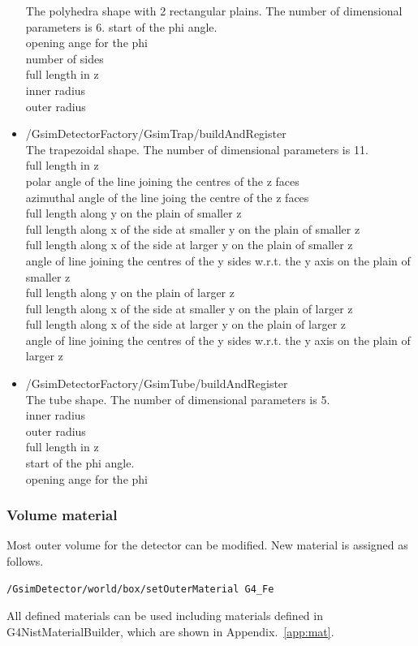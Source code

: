 \documentclass[a4paper,12pt]{article}
\begin{document}
\begin{itemize}
	The polyhedra shape with 2 rectangular plains.
	The number of dimensional parameters is 6.
	start of the phi angle.\\
	opening ange for the phi\\
	number of sides\\
	full length in z\\
	inner radius\\
	outer radius
  \item /GsimDetectorFactory/GsimTrap/buildAndRegister\\
	The trapezoidal shape.
	The number of dimensional parameters is 11.\\
	full length in z\\
	polar angle of the line joining the centres of the z faces\\
	azimuthal angle of the line joing the centre of the z faces\\
	full length along y on the plain of smaller z\\
	full length along x of the side at smaller y on the plain of smaller z\\
	full length along x of the side at larger y on the plain of smaller z\\
	angle of line joining the centres of the y sides w.r.t. the y
	axis on the plain of smaller z\\
	full length along y on the plain of larger z\\
	full length along x of the side at smaller y on the plain of larger z\\
	full length along x of the side at larger y on the plain of larger z\\
	angle of line joining the centres of the y sides w.r.t. the y
	axis on the plain of larger z
  \item /GsimDetectorFactory/GsimTube/buildAndRegister\\
	The tube shape.
	The number of dimensional parameters is 5.\\
	inner radius\\
	outer radius\\
	full length in z\\
	start of the phi angle.\\
	opening ange for the phi
 \end{itemize}
 \subsubsection{Volume material}
 Most outer volume for the detector can be modified. New material is
 assigned as follows.
 \begin{screen}
  \begin{verbatim}
/GsimDetector/world/box/setOuterMaterial G4_Fe\end{verbatim}
 \end{screen}
  All defined materials can be used including materials defined in
  G4NistMaterialBuilder, which are shown in Appendix.~\ref{app:mat}. 
 
\end{document}
